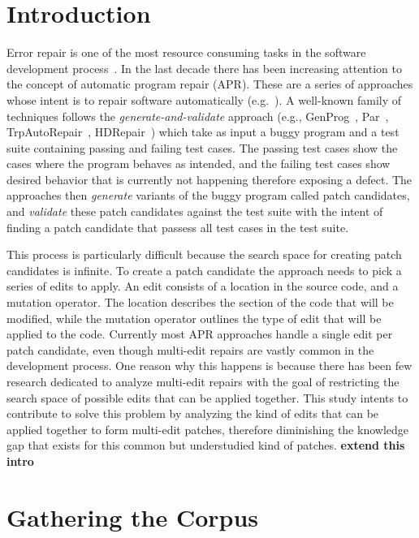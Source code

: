\documentclass[sigconf]{acmart}
\newcommand{\todo}[1]
  {{\scriptsize \textbf{\color{red} {#1}}}}
\begin{document}
\section{Introduction}
Error repair is one of the most resource consuming tasks in 
the software development process~\cite{Weiss07,Tassey02,Britton13}.
In the last decade there has been increasing attention to 
the concept of automatic program repair (APR). These are a 
series of approaches whose intent is to repair software
automatically (e.g.~\cite{legoues12,kim2013,Weimer13,long15SPR,long16proph,debroy10,perkins09,wei10}).
A well-known family of techniques follows the \emph{generate-and-validate}
approach (e.g., GenProg~\cite{legoues12}, 
Par~\cite{kim2013}, TrpAutoRepair~\cite{Qi13TrpAutoR}, HDRepair~\cite{xuan16}) 
which take as input a buggy program and a test suite containing
passing and failing test cases.
The passing test cases show the cases where the program  
behaves as intended, and the failing test cases show desired behavior
that is currently not happening therefore exposing a defect.
The approaches then \emph{generate} variants of the buggy program
called patch candidates, and \emph{validate} these patch
candidates against the test suite with the intent of finding 
a patch candidate that passess all test cases in the test suite.

This process is particularly difficult because the search space
for creating patch candidates is infinite. To create a patch 
candidate the approach needs to pick a series of edits to apply.
An edit consists of a location in the source code,
and a mutation operator. The location describes the section
of the code that will be modified, while the mutation operator
outlines the type of edit that will be applied to the code.
Currently most APR approaches handle a single edit per patch
candidate, even though multi-edit repairs are vastly common in the 
development process. One reason why this happens is because
there has been few research dedicated to analyze multi-edit
repairs with the goal of restricting the search space of possible edits that 
can be applied together. This study intents to contribute to
solve this problem by analyzing  
the kind of edits that can be applied together to form
multi-edit patches, therefore diminishing the knowledge
gap that exists for this common but understudied kind of patches.
\todo{extend this intro}

\section{Gathering the Corpus}
\end{document}
